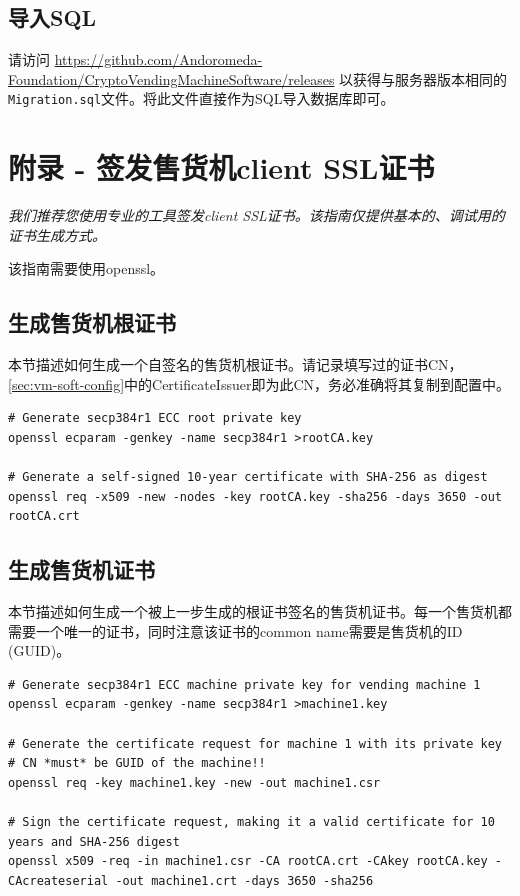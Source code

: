 \documentclass[a4paper,11pt]{article}
\theoremstyle{definition}
\begin{document}
\subsection{导入SQL}

请访问 \url{https://github.com/Andoromeda-Foundation/CryptoVendingMachineSoftware/releases} 以获得与服务器版本相同的 \verb|Migration.sql|文件。将此文件直接作为SQL导入数据库即可。

\section{附录 - 签发售货机client SSL证书}\label{sec:ssl-cert}

\emph{我们推荐您使用专业的工具签发client SSL证书。该指南仅提供基本的、调试用的证书生成方式。}

该指南需要使用openssl。

\subsection{生成售货机根证书}\label{sec:ssl-cert:root}

本节描述如何生成一个自签名的售货机根证书。请记录填写过的证书CN，\ref{sec:vm-soft-config}中的CertificateIssuer即为此CN，务必准确将其复制到配置中。

\begin{lstlisting}
# Generate secp384r1 ECC root private key
openssl ecparam -genkey -name secp384r1 >rootCA.key 

# Generate a self-signed 10-year certificate with SHA-256 as digest
openssl req -x509 -new -nodes -key rootCA.key -sha256 -days 3650 -out rootCA.crt 
\end{lstlisting}


\subsection{生成售货机证书}

本节描述如何生成一个被上一步生成的根证书签名的售货机证书。每一个售货机都需要一个唯一的证书，同时注意该证书的common name需要是售货机的ID (GUID)。

\begin{lstlisting}
# Generate secp384r1 ECC machine private key for vending machine 1
openssl ecparam -genkey -name secp384r1 >machine1.key

# Generate the certificate request for machine 1 with its private key
# CN *must* be GUID of the machine!!
openssl req -key machine1.key -new -out machine1.csr

# Sign the certificate request, making it a valid certificate for 10 years and SHA-256 digest
openssl x509 -req -in machine1.csr -CA rootCA.crt -CAkey rootCA.key -CAcreateserial -out machine1.crt -days 3650 -sha256
\end{lstlisting}
\end{document}
